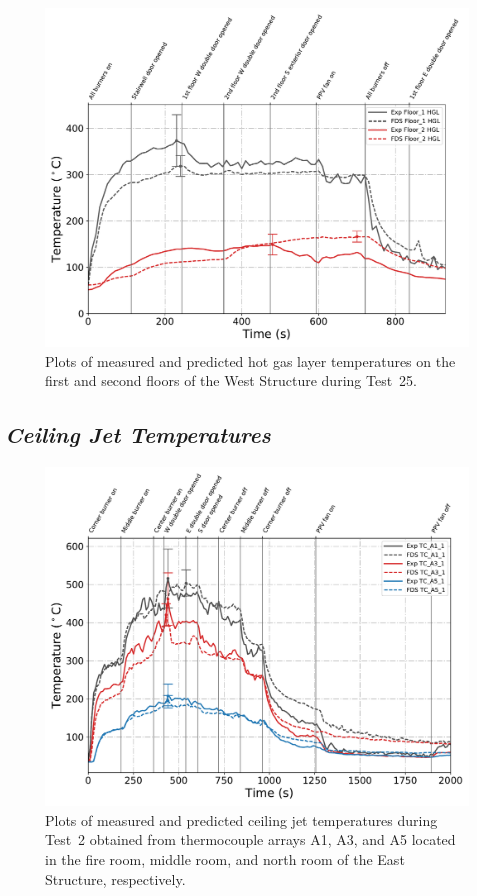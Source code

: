 \begin{figure}[!h]
	\centering
	\includegraphics[width=\columnwidth]{Figures/Plots/Validation/Temperature/Test_25_HGL}
	\caption[Plots of measured and predicted hot gas layer temperatures during Test~25.]{Plots of measured and predicted hot gas layer temperatures on the first and second floors of the West Structure during Test~25.}
	\label{fig:HGL_data_Test25}
\end{figure}

\clearpage
\subsection*{\textit{Ceiling Jet Temperatures}}
\begin{figure}[!h]
	\centering
	\includegraphics[width=\columnwidth]{Figures/Plots/Validation/Temperature/Test_2_cjet_1}
	\caption[Plots of measured and predicted ceiling jet temperatures during Test~2.]{Plots of measured and predicted ceiling jet temperatures during Test~2 obtained from thermocouple arrays A1, A3, and A5 located in the fire room, middle room, and north room of the East Structure, respectively.}
	\label{fig:cjet1_data_Test2}
\end{figure}

